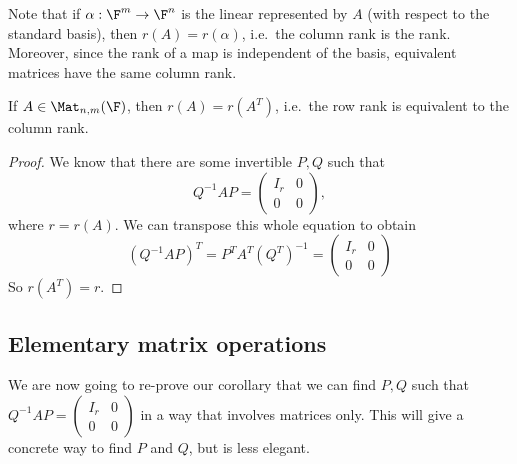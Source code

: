 \documentclass[a4paper]{article}
\begin{document}
Note that if $\alpha: \F^m \to \F^n$ is the linear represented by $A$ (with respect to the standard basis), then $r(A) = r(\alpha)$, i.e.\ the column rank is the rank. Moreover, since the rank of a map is independent of the basis, equivalent matrices have the same column rank.

\begin{thm}
  If $A \in \Mat_{n, m}(\F)$, then $r(A) = r(A^T)$, i.e.\ the row rank is equivalent to the column rank.
\end{thm}

\begin{proof}
  We know that there are some invertible $P, Q$ such that
  \[
    Q^{-1}AP =
    \begin{pmatrix}
      I_r & 0\\
      0 & 0
    \end{pmatrix},
  \]
  where $r = r(A)$. We can transpose this whole equation to obtain
  \[
    (Q^{-1}AP)^T = P^T A^T (Q^T)^{-1} =
    \begin{pmatrix}
      I_r & 0\\
      0 & 0
    \end{pmatrix}
  \]
  So $r(A^T) = r$.
\end{proof}

\subsection{Elementary matrix operations}
We are now going to re-prove our corollary that we can find $P, Q$ such that $Q^{-1}AP = \begin{pmatrix} I_r & 0\\ 0 & 0 \end{pmatrix}$ in a way that involves matrices only. This will give a concrete way to find $P$ and $Q$, but is less elegant.
\end{document}
